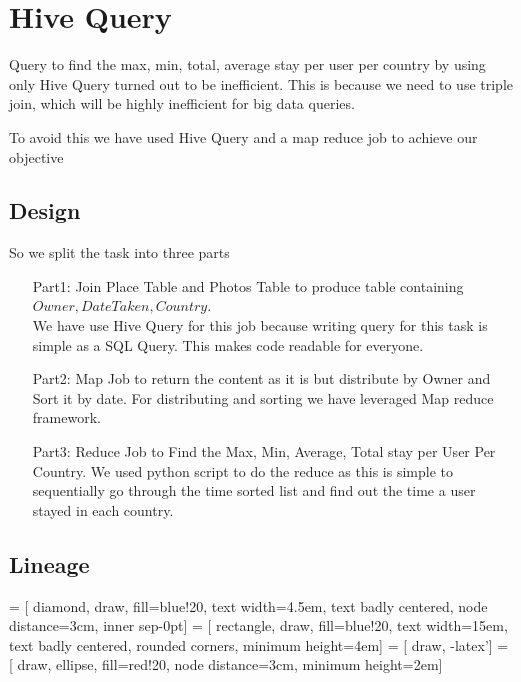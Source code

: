 \chapter{Hive Query}

	Query to find the max, min, total, average stay per user per country by using only Hive Query turned out to be inefficient. This is because we need to use triple join, which will be highly inefficient for big data queries. 
	
	To avoid this we have used Hive Query and a map reduce job to achieve our objective
		
\section{Design}
	So we split the task into three parts \\
	\begin{itemize}
		\item [Part1:] Join Place Table and Photos Table to produce table containing \(Owner, Date Taken, Country\). \\
		We have use Hive Query for this job because writing query for this task is simple as a SQL Query. This makes code readable for everyone. 
		\item [Part2:] Map Job to return the content as it is but distribute by Owner and Sort it by date. 
		For distributing and sorting we have leveraged Map reduce framework.
		\item [Part3:] Reduce Job to Find the Max, Min, Average, Total stay per User Per Country. 
		We used python script to do the reduce as this is simple to sequentially go through the time sorted list and find out the time a user stayed in each country. 
	\end{itemize}

\section{Lineage}
	
\usetikzlibrary{shapes.geometric,arrows}

 = [ diamond, draw, fill=blue!20, text width=4.5em, text badly centered, node distance=3cm, inner sep-0pt]  
 = [ rectangle, draw, fill=blue!20, text width=15em, text badly centered, rounded corners, minimum height=4em]  
 = [ draw, -latex']  
 = [ draw, ellipse, fill=red!20, node distance=3cm, minimum height=2em]  

